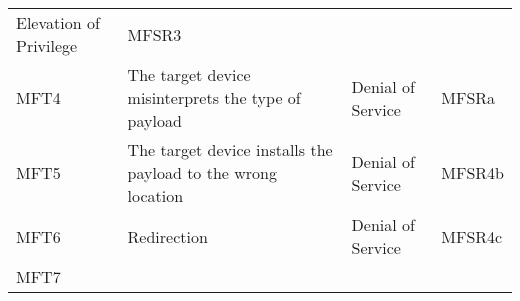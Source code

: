 \begin{longtable}[]{@{}llll@{}}
\begin{minipage}[t]{0.30\columnwidth}
Elevation of Privilege\strut
\end{minipage} & \begin{minipage}[t]{0.09\columnwidth}\raggedright\strut
MFSR3\strut
\end{minipage}\tabularnewline
\begin{minipage}[t]{0.05\columnwidth}\raggedright\strut
MFT4\strut
\end{minipage} & \begin{minipage}[t]{0.44\columnwidth}\raggedright\strut
The target device misinterprets the type of payload\strut
\end{minipage} & \begin{minipage}[t]{0.30\columnwidth}\raggedright\strut
Denial of Service\strut
\end{minipage} & \begin{minipage}[t]{0.09\columnwidth}\raggedright\strut
MFSRa\strut
\end{minipage}\tabularnewline
\begin{minipage}[t]{0.05\columnwidth}\raggedright\strut
MFT5\strut
\end{minipage} & \begin{minipage}[t]{0.44\columnwidth}\raggedright\strut
The target device installs the payload to the wrong location\strut
\end{minipage} & \begin{minipage}[t]{0.30\columnwidth}\raggedright\strut
Denial of Service\strut
\end{minipage} & \begin{minipage}[t]{0.09\columnwidth}\raggedright\strut
MFSR4b\strut
\end{minipage}\tabularnewline
\begin{minipage}[t]{0.05\columnwidth}\raggedright\strut
MFT6\strut
\end{minipage} & \begin{minipage}[t]{0.44\columnwidth}\raggedright\strut
Redirection\strut
\end{minipage} & \begin{minipage}[t]{0.30\columnwidth}\raggedright\strut
Denial of Service\strut
\end{minipage} & \begin{minipage}[t]{0.09\columnwidth}\raggedright\strut
MFSR4c\strut
\end{minipage}\tabularnewline
\begin{minipage}[t]{0.05\columnwidth}\raggedright\strut
MFT7\strut
\end{minipage} & \begin{minipage}[t]{0.44\columnwidth}\raggedright\strut

\end{minipage}
\end{longtable}
